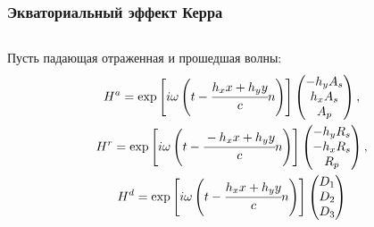\documentclass[handout]{beamer}
\newcommand{\inner}[1]{\left( #1 \right)}
\newcommand{\insqr}[1]{\left[ #1 \right]}
\begin{document}
\begin{frame}
    \frametitle{Экваториальный эффект Керра}
    \begin{columns}
        \begin{column}{0.7\textwidth}
            Пусть падающая отраженная и прошедшая волны:
            \begin{gather*}
                H^a = \exp  \insqr{i\omega \inner{t - \cfrac{h_xx+h_yy}{c}n}}
                \begin{pmatrix}
                    -h_y A_s\\
                    h_x A_s\\
                    A_p
                \end{pmatrix}, \\
                H^r = \exp  \insqr{i\omega \inner{t - \cfrac{-h_xx+h_yy}{c}n}}       
                \begin{pmatrix}
                    -h_y R_s\\
                    -h_x R_s\\
                    R_p
                \end{pmatrix}, \\
                H^d = \exp  \insqr{i\omega \inner{t - \cfrac{h_xx+h_yy}{c}n}}      
                \begin{pmatrix}
                    D_1\\
                    D_2\\
                    D_3
                \end{pmatrix}
            \end{gather*}
        \end{column}


\end{columns}
\end{frame}
\end{document}
